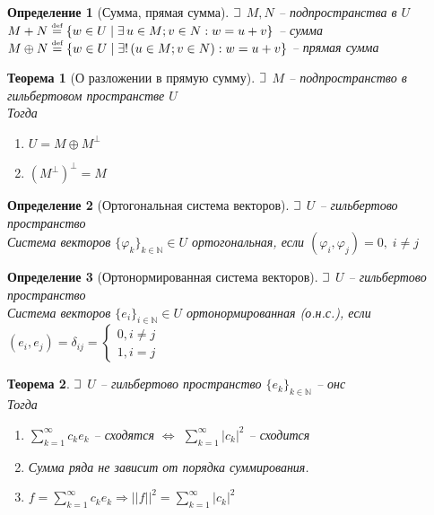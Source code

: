\documentclass{article}
\theoremstyle{truestyle}
\newtheorem*{defenition}{Определение}
\newtheorem*{theorem}{Теорема}
\newcommand{\eqdef}{\overset{\text{\tiny def}}=}
\def\letus{%
	\mathord{\setbox0=\hbox{$\exists$}%
		\hbox{\kern 0.125\wd0%
			\vbox to \ht0{%
				\hrule width 0.75\wd0%
				\vfill%
				\hrule width 0.75\wd0}%
			\vrule height \ht0%
			\kern 0.125\wd0}%
	}%
}
\begin{document}
\begin{defenition}[Сумма, прямая сумма]
  $\letus$ $M, N$ -- подпространства в $U$\\
  $M + N \eqdef \{w \in U \mid \exists \, u \in M; v\in N: w = u + v\}$ -- сумма\\
  $M \oplus N \eqdef \{w \in U \mid \exists ! \, (u \in M; v\in N): w = u + v\}$ -- прямая сумма
\end{defenition}

\begin{theorem}[О разложении в прямую сумму]
  $\letus$ $M$ -- подпространство в гильбертовом пространстве $U$\\
  Тогда\begin{minipage}[t]{0.8\linewidth}\begin{enumerate}[itemsep=1mm]
    \item $U = M \oplus M^{\perp}$
    \item $(M^{\perp})^{\perp} = M$
  \end{enumerate}\end{minipage}
\end{theorem}

\begin{defenition}[Ортогональная система векторов]
  $\letus$ $U$ -- гильбертово пространство\\
  Система векторов $\{\varphi_k\}_{k\in \mathbb{N}} \in U$ ортогональная, если $(\varphi_i, \varphi_j) = 0, \; i \not= j$
\end{defenition}

\begin{defenition}[Ортонормированная система векторов]
  $\letus$ $U$ -- гильбертово пространство\\
  Система векторов $\{e_i\}_{i \in \mathbb{N}} \in U$ ортонормированная (о.н.с.), если
  $(e_i, e_j) = \delta_{ij} = \left\{ \begin{aligned}0, i \not= j\\ 1, i = j\end{aligned} \right.$
\end{defenition}

\begin{theorem}
  $\letus$ $U$ -- гильбертово пространство  $\{e_k\}_{k \in \mathbb{N}}$ -- онс\\
  Тогда\begin{minipage}[t]{0.8\linewidth}\begin{enumerate}[itemsep=1mm]
      \item $\sum\limits_{k = 1}^{\infty}c_k e_k$ -- сходятся $\Leftrightarrow$ $\sum\limits_{k = 1}^{\infty}|c_k|^2$ -- сходится
      \item Сумма ряда не зависит от порядка суммирования.
      \item $f = \sum\limits_{k = 1}^{\infty}c_k e_k \Rightarrow ||f||^2 = \sum\limits_{k = 1}^{\infty} |c_k|^2$
  \end{enumerate}\end{minipage}
\end{theorem}
\end{document}

